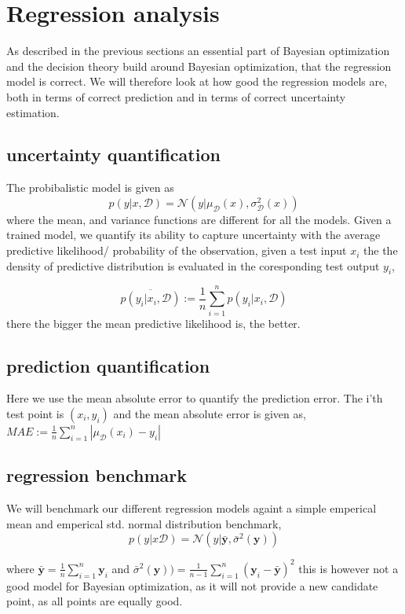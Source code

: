\section{Regression analysis}
As described in the previous sections an essential part of Bayesian optimization and the decision theory build 
around Bayesian optimization, that the regression model is correct. We will therefore look at how good the
regression models are, both in terms of correct prediction and in terms of correct uncertainty estimation. 

\subsection{uncertainty quantification}
The probibalistic model is given as 
$$p(y|x,\mathcal{D}) = \mathcal{N}(y|\mu_{\mathcal{D}}(x), \sigma_{\mathcal{D}}^2(x))$$
where the mean, and variance functions are different for all the models. 
Given a trained model, we quantify its ability to capture uncertainty with the average
predictive likelihood/ probability of the observation, given a test input $x_i$ the
the density of predictive distribution is evaluated in the coresponding test output $y_i$,

$$\overline{p(y_i|x_i,\mathcal{D})} := \frac{1}{n}\sum_{i=1}^n p(y_i|x_i,\mathcal{D})$$
there the bigger the mean predictive likelihood is, the better. 

\subsection{prediction quantification}
Here we use the mean absolute error to quantify the prediction error. The i'th test point is
$(x_i,y_i)$ and the mean absolute error is given as, 
$MAE :=\frac{1}{n}\sum_{i=1}^n |\mu_{\mathcal{D}}(x_i) - y_i| $

\subsection{regression benchmark}
We will benchmark our different regression models againt a simple emperical mean and
emperical std. normal distribution benchmark, 
$$p(y|x\mathcal{D}) = \mathcal{N}(y| \bar{\textbf{y}} , \bar{\sigma}^2 (\textbf{y}))$$

where $\bar{\textbf{y}} = \frac{1}{n}\sum_{i=1}^n \textbf{y}_i $ and 
$\bar{\sigma}^2 (\textbf{y})) = \frac{1}{n-1}\sum_{i=1}^n (\textbf{y}_i-\bar{\textbf{y}})^2 $
this is however not a good model for Bayesian optimization, as it will not provide a
new candidate point, as all points are equally good. 


